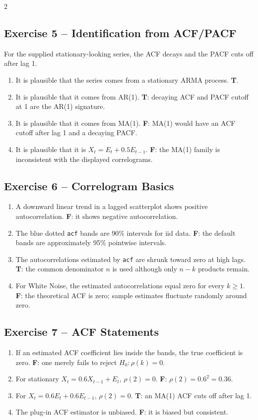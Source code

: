 \documentclass[9pt,a4paper]{extarticle}
\begin{document}
\begin{multicols}{2}
\subsection*{Exercise 5 -- Identification from ACF/PACF}
For the supplied stationary-looking series, the ACF decays and the PACF cuts off after lag 1.
\begin{enumerate}[label=\alph*),leftmargin=4mm]
\item It is plausible that the series comes from a stationary ARMA process. \textbf{T}.
\item It is plausible that it comes from AR(1). \textbf{T}: decaying ACF and PACF cutoff at 1 are the AR(1) signature.
\item It is plausible that it comes from MA(1). \textbf{F}: MA(1) would have an ACF cutoff after lag 1 and a decaying PACF.
\item It is plausible that it is \(X_t=E_t+0.5E_{t-1}\). \textbf{F}: the MA(1) family is inconsistent with the displayed correlograms.
\end{enumerate}

\subsection*{Exercise 6 -- Correlogram Basics}
\begin{enumerate}[label=\alph*),leftmargin=4mm]
\item A downward linear trend in a lagged scatterplot shows positive autocorrelation. \textbf{F}: it shows negative autocorrelation.
\item The blue dotted \texttt{acf} bands are 90\% intervals for iid data. \textbf{F}: the default bands are approximately 95\% pointwise intervals.
\item The autocorrelations estimated by \texttt{acf} are shrunk toward zero at high lags. \textbf{T}: the common denominator \(n\) is used although only \(n-k\) products remain.
\item For White Noise, the estimated autocorrelations equal zero for every \(k\ge1\). \textbf{F}: the theoretical ACF is zero; sample estimates fluctuate randomly around zero.
\end{enumerate}

\subsection*{Exercise 7 -- ACF Statements}
\begin{enumerate}[label=\alph*),leftmargin=4mm]
\item If an estimated ACF coefficient lies inside the bands, the true coefficient is zero. \textbf{F}: one merely fails to reject \(H_0:\rho(k)=0\).
\item For stationary \(X_t=0.6X_{t-1}+E_t\), \(\rho(2)=0\). \textbf{F}: \(\rho(2)=0.6^2=0.36\).
\item For \(X_t=0.6E_t+0.6E_{t-1}\), \(\rho(2)=0\). \textbf{T}: an MA(1) ACF cuts off after lag 1.
\item The plug-in ACF estimator is unbiased. \textbf{F}: it is biased but consistent.
\end{enumerate}


\end{multicols}
\end{document}
